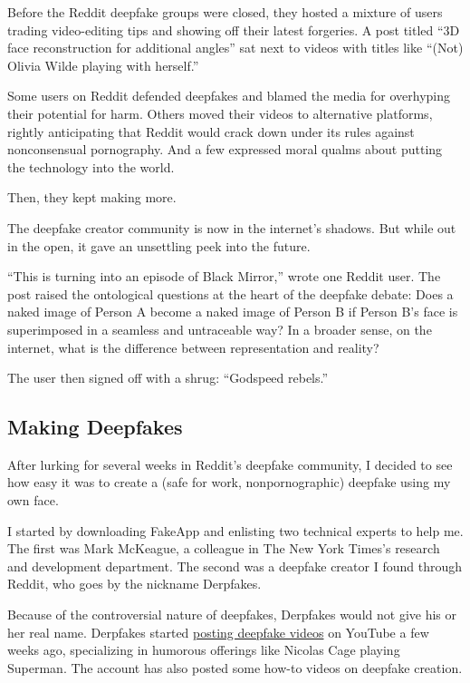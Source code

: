 Before the Reddit deepfake groups were closed, they hosted a mixture of
users trading video-editing tips and showing off their latest forgeries.
A post titled ``3D face reconstruction for additional angles'' sat next
to videos with titles like ``(Not) Olivia Wilde playing with herself.''

Some users on Reddit defended deepfakes and blamed the media for
overhyping their potential for harm. Others moved their videos to
alternative platforms, rightly anticipating that Reddit would crack down
under its rules against nonconsensual pornography. And a few expressed
moral qualms about putting the technology into the world.

Then, they kept making more.

The deepfake creator community is now in the internet's shadows. But
while out in the open, it gave an unsettling peek into the future.

``This is turning into an episode of Black Mirror,'' wrote one Reddit
user. The post raised the ontological questions at the heart of the
deepfake debate: Does a naked image of Person A become a naked image of
Person B if Person B's face is superimposed in a seamless and
untraceable way? In a broader sense, on the internet, what is the
difference between representation and reality?

The user then signed off with a shrug: ``Godspeed rebels.''

\hypertarget{making-deepfakes}{%
\subsection{Making Deepfakes}\label{making-deepfakes}}

After lurking for several weeks in Reddit's deepfake community, I
decided to see how easy it was to create a (safe for work,
nonpornographic) deepfake using my own face.

I started by downloading FakeApp and enlisting two technical experts to
help me. The first was Mark McKeague, a colleague in The New York
Times's research and development department. The second was a deepfake
creator I found through Reddit, who goes by the nickname Derpfakes.

Because of the controversial nature of deepfakes, Derpfakes would not
give his or her real name. Derpfakes started
\href{https://www.youtube.com/channel/UCUix6Sk2MZkVOr5PWQrtH1g}{posting
deepfake videos} on YouTube a few weeks ago, specializing in humorous
offerings like Nicolas Cage playing Superman. The account has also
posted some how-to videos on deepfake creation.

